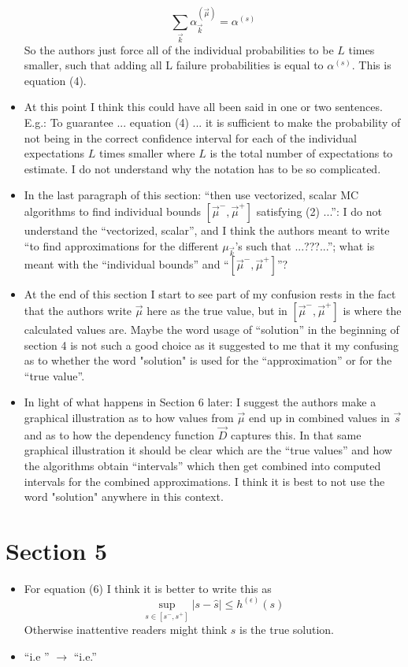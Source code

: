 \documentclass{article}[12pt]
\newcommand{\RefereeTODO}[1]{{\color{red} #1 \newline}}
\begin{document}
\begin{itemize}
{    $$\sum_{\vec{k}} \alpha_{\vec{k}}^{(\vec{\mu})} = \alpha^{(s)}$$
    So the authors just force all of the individual probabilities to be $L$ times smaller, such that adding all L failure probabilities is equal to $\alpha^{(s)}$. This is equation (4).}
    \item \RefereeTODO{At this point I think this could have all been said in one or two sentences. E.g.: To guarantee ... equation (4) ... it is sufficient to make the probability of not being in the correct confidence interval for each of the individual expectations $L$ times smaller where $L$ is the total number of expectations to estimate. I do not understand why the notation has to be so complicated.}
    \item \RefereeTODO{In the last paragraph of this section: ``then use vectorized, scalar MC algorithms to find individual bounds $[\vec{\mu}^-, \vec{\mu}^+]$ satisfying (2) ...'': I do not understand the ``vectorized, scalar'', and I think the authors meant to write ``to find approximations for the different $\mu_{\vec{k}}$'s such that ...???...''; what is meant with the ``individual bounds'' and ``$[\vec{\mu}^-, \vec{\mu}^+]$''?}
    \item \RefereeTODO{At the end of this section I start to see part of my confusion rests in the fact that the authors write $\vec{\mu}$ here as the true value, but in $[\vec{\mu}^-, \vec{\mu}^+]$ is where the calculated values are. Maybe the word usage of ``solution'' in the beginning of section 4 is not such a good choice as it suggested to me that it my confusing as to whether the word "solution" is used for the ``approximation'' or for the ``true value''.} 
    \item \RefereeTODO{In light of what happens in Section 6 later: I suggest the authors make a graphical illustration as to how values from $\vec{\mu}$ end up in combined values in $\vec{s}$ and as to how the dependency function $\vec{D}$ captures this. In that same graphical illustration it should be clear which are the ``true values'' and how the algorithms obtain ``intervals'' which then get combined into computed intervals for the combined approximations. I think it is best to not use the word "solution" anywhere in this context.}
\end{itemize}

\section{Section 5}

\begin{itemize}
    \item \RefereeTODO{For equation (6) I think it is better to write this as
    $$\sup_{s \in [s^-, s^+]} |s - \hat{s}| \le h^{(\epsilon)}(s)$$
  Otherwise inattentive readers might think $s$ is the true solution.}
  \item \RefereeTODO{``i.e '' $\to$ ``i.e.''}
\end{itemize}
\end{document}
